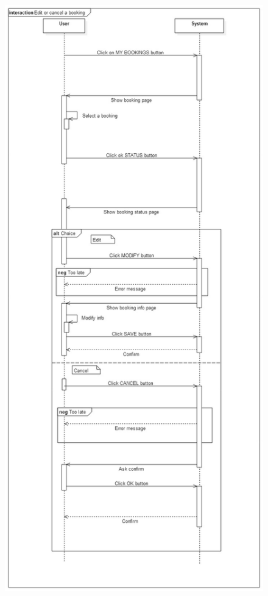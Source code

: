 \newpage
\begin{figure}[h!]
	\centering
	\includegraphics[height=0.95\textheight]{"myTaxiServiceImg/SequenceDiagram/Edit or cancel a booking"}
\end{figure}
\newpage

